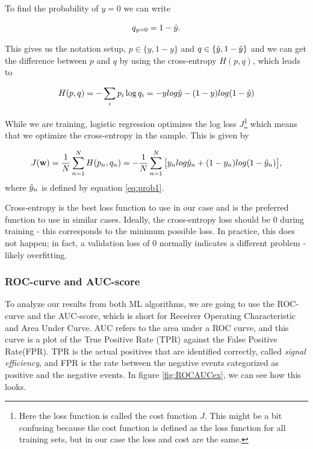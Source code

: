 To find the probability of $y=0$ we can write

\begin{equation}
    \label{eq:prob0}
    q_{y=0} = 1- \Hat{y}.
\end{equation}

This gives us the notation setup, $p \in \{y, 1-y\}$ and $q \in \{\Hat{y}, 1-\Hat{y}\}$ and we can get the difference between $p$ and $q$ by using the cross-entropy $H(p,q)$, which leads to

\begin{equation}
    \label{eq:crossentropy}
    H(p,q) = - \sum_i p_i \log q_i = - y log \Hat{y} - (1-y) log(1-\Hat{y})
\end{equation}

While we are training, logistic regression optimizes the log loss $J$\footnote{Here the loss function is called the cost function $J$. This might be a bit confusing because the cost function is defined as the loss function for all training sets, but in our case the loss and cost are the same.} which means that we optimize the cross-entropy in the sample. This is given by

\begin{equation}
    \label{eq:loss}
    J(\textbf{w}) = \frac{1}{N} \sum_{n=1}^N H(p_n, q_n) = - \frac{1}{N} \sum_{n=1}^N \big[y_n log \Hat{y}_n + (1-y_n) log(1-\Hat{y}_n)\big],
\end{equation}
where $\Hat{y}_n$ is defined by equation \ref{eq:prob1}.

Cross-entropy is the best loss function to use in our case and is the preferred function to use in similar cases. Ideally, the cross-entropy loss should be 0 during training - this corresponds to the minimum possible loss. In practice, this does not happen; in fact, a validation loss of 0 normally indicates a different problem  - likely overfitting. 


\subsubsection{ROC-curve and AUC-score}
To analyze our results from both ML algorithms, we are going to use the ROC-curve and the AUC-score, which is short for Receiver Operating Characteristic and Area Under Curve. AUC refers to the area under a ROC curve, and this curve is a plot of the True Positive Rate (TPR) against the False Positive Rate(FPR). TPR is the actual positives that are identified correctly, called \textit{signal efficiency}, and FPR is the rate between the negative events categorized as positive and the negative events. In figure \ref{fig:ROCAUCex}, we can see how this looks. 

